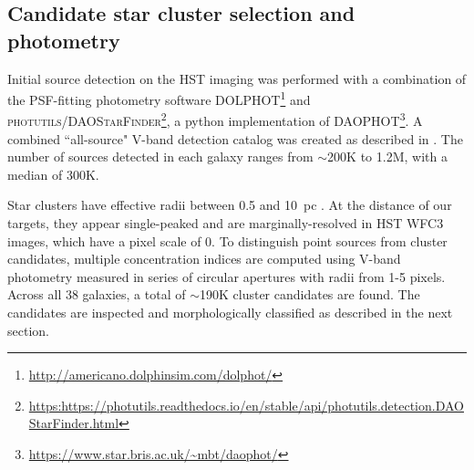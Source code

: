\documentclass[linenumbers]{aastex63}
\begin{document}
\subsection{Candidate star cluster selection and photometry}\label{ssect:select_photo}

Initial source detection \citep{thilker_phangs-hst_2022} on the HST imaging was performed with a combination of the PSF-fitting photometry software \textsc{DOLPHOT}\footnote{\url{http://americano.dolphinsim.com/dolphot/}} \citep[v2.0,][]{dolphin_dolphot_2016} and \textsc{photutils/DAOStarFinder}\footnote{\url{https:https://photutils.readthedocs.io/en/stable/api/photutils.detection.DAOStarFinder.html}}\citep[][]{bradley_astropyphotutils_2023}, a python implementation of \textsc{DAOPHOT}\footnote{\url{https://www.star.bris.ac.uk/~mbt/daophot/}}\citep[v1.3-2][]{stetson_daophot_1987}. A combined ``all-source" V-band detection catalog was created as described in \citet{thilker_phangs-hst_2022}. The number of sources detected in each galaxy ranges from $\sim$200K to 1.2M, with a median of 300K.




Star clusters have effective radii between 0.5 and 10~pc \citep{portegies_zwart_young_2010,ryon_effective_2017,krumholz_star_2019,brown_radii_2021}. At the distance of our targets, they appear single-peaked and are marginally-resolved in HST WFC3 images, which have a pixel scale of 0.  To distinguish point sources from cluster candidates, multiple concentration indices \citep[MCI, ][]{thilker_phangs-hst_2022} are computed using V-band photometry measured in series of circular apertures with radii from 1-5 pixels.  Across all 38 galaxies, a total of $\sim$190K cluster candidates are found.  The candidates are inspected and morphologically classified as described in the next section.  
\end{document}
